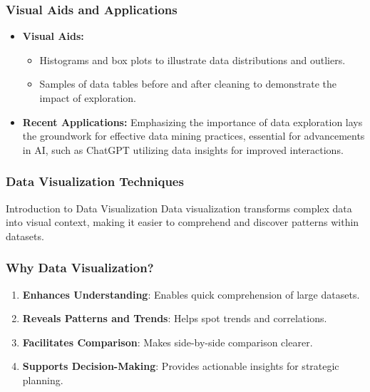 \documentclass[aspectratio=169]{beamer}
\begin{document}
\begin{frame}[fragile]
    \frametitle{Visual Aids and Applications}
    \begin{itemize}
        \item \textbf{Visual Aids:}
            \begin{itemize}
                \item Histograms and box plots to illustrate data distributions and outliers.
                \item Samples of data tables before and after cleaning to demonstrate the impact of exploration.
            \end{itemize}
        \item \textbf{Recent Applications:} Emphasizing the importance of data exploration lays the groundwork for effective data mining practices, essential for advancements in AI, such as ChatGPT utilizing data insights for improved interactions.
    \end{itemize}
\end{frame}

\begin{frame}[fragile]
    \frametitle{Data Visualization Techniques}
    \begin{block}{Introduction to Data Visualization}
        Data visualization transforms complex data into visual context, making it easier to comprehend and discover patterns within datasets.
    \end{block}
\end{frame}

\begin{frame}[fragile]
    \frametitle{Why Data Visualization?}
    \begin{enumerate}
        \item \textbf{Enhances Understanding}: Enables quick comprehension of large datasets.
        \item \textbf{Reveals Patterns and Trends}: Helps spot trends and correlations.
        \item \textbf{Facilitates Comparison}: Makes side-by-side comparison clearer.
        \item \textbf{Supports Decision-Making}: Provides actionable insights for strategic planning.
    \end{enumerate}
\end{frame}
\end{document}
